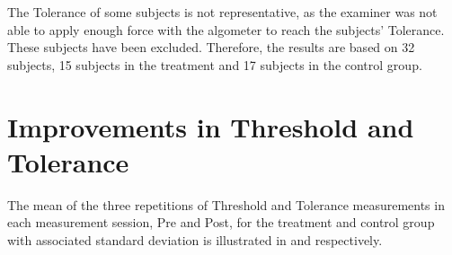 The Tolerance of some subjects is not representative, as the examiner was not able to apply enough force with the algometer to reach the subjects' Tolerance. These subjects have been excluded. Therefore, the results are based on 32 subjects, 15 subjects in the treatment and 17 subjects in the control group.

\section{Improvements in Threshold and Tolerance}
The mean of the three repetitions of Threshold and Tolerance measurements in each measurement session, Pre and Post, for the treatment and control group with associated standard deviation is illustrated in  and  respectively. 

